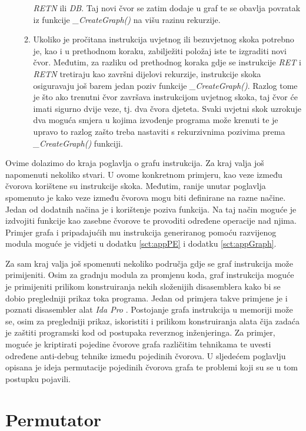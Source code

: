 \documentclass[times, utf8, diplomski, numeric]{fer}
\begin{document}
\begin{enumerate}
\begin{enumerate}
\emph{RETN} ili \emph{DB}. Taj novi čvor se zatim dodaje u graf te se obavlja
povratak iz funkcije \emph{\_CreateGraph()} na višu razinu rekurzije.
\item Ukoliko je pročitana instrukcija uvjetnog ili bezuvjetnog skoka potrebno
je, kao i u prethodnom koraku, zabilježiti položaj iste te izgraditi novi čvor.
Međutim, za razliku od prethodnog koraka gdje se instrukcije \emph{RET} i
\emph{RETN} tretiraju kao završni dijelovi rekurzije, instrukcije skoka
osiguravaju još barem jedan poziv funkcije \emph{\_CreateGraph()}. Razlog tome
je što ako trenutni čvor završava instrukcijom uvjetnog skoka, taj čvor će
imati sigurno dvije veze, tj. dva čvora djeteta. Svaki uvjetni skok uzrokuje
dva moguća smjera u kojima izvođenje programa može krenuti te je upravo to
razlog zašto treba nastaviti s rekurzivnima pozivima prema
\emph{\_CreateGraph()} funkciji.
\end{enumerate}
\end{enumerate} 
Ovime dolazimo do kraja poglavlja o grafu instrukcija. Za kraj valja još
napomenuti nekoliko stvari. U ovome konkretnom primjeru, kao veze između
čvorova korištene su instrukcije skoka. Međutim, ranije unutar poglavlja
spomenuto je kako veze između čvorova mogu biti definirane na razne načine.
Jedan od dodatnih načina je i korištenje poziva funkcija. Na taj način moguće
je izdvojiti funkcije kao zasebne čvorove te provoditi određene operacije nad
njima. Primjer grafa i pripadajućih mu instrukcija generiranog pomoću
razvijenog modula moguće je vidjeti u dodatku \ref{sct:appPE} i dodatku 
\ref{sct:appGraph}.

Za sam kraj valja još spomenuti nekoliko područja gdje se graf instrukcija može
primijeniti. Osim za gradnju modula za promjenu koda, graf instrukcija moguće
je primijeniti prilikom konstruiranja nekih složenijih disasemblera kako bi se
dobio pregledniji prikaz toka programa. Jedan od primjera takve primjene je i
poznati disasembler alat \emph{Ida Pro} \citep{ida}. Postojanje grafa
instrukcija u memoriji može se, osim za pregledniji prikaz, iskoristiti i
prilikom konstruiranja alata čija zadaća je zaštiti programski kod od postupaka
reverznog inženjeringa. Za primjer, moguće je kriptirati pojedine čvorove grafa
različitim tehnikama te uvesti određene anti-debug tehnike između pojedinih
čvorova. U sljedećem poglavlju opisana je ideja permutacije pojedinih čvorova
grafa te problemi koji su se u tom postupku pojavili.

\section{Permutator}
\label{sct:permutator}
\end{document}
